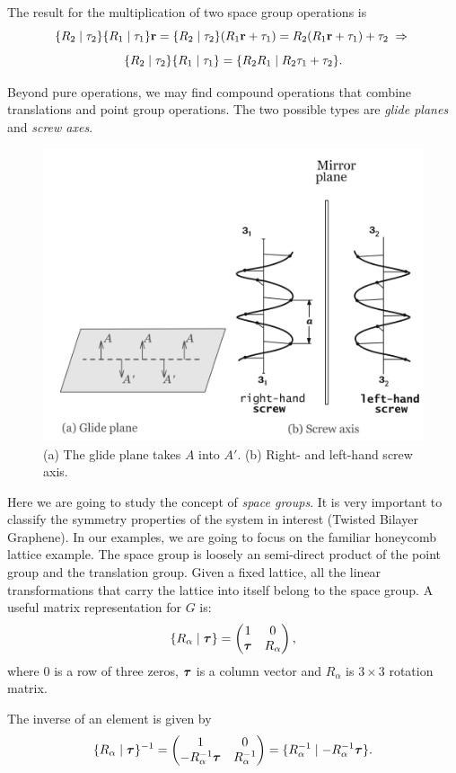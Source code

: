 The result for the multiplication of two space group operations is
$$
\{ R_2 \mid \tau_2 \} \{ R_1 \mid \tau_1 \} {\vb{r}} = \{ R_2 \mid \tau_2 \} (R_1 {\vb{r}} + \tau_1) =
R_2(R_1 {\vb{r}} + \tau_1) + \tau_2 \; \Rightarrow \;
$$
\begin{equation} \label{eq:multiplication_two_space_group_elements}
\{ R_2 \mid \tau_2 \} \{ R_1 \mid \tau_1 \} = \{ R_2 R_1 \mid R_2\tau_1 + \tau_2 \}.
\end{equation}

Beyond pure operations, we may find compound operations that combine translations and point group operations. The two possible types are \textit{glide planes} and \textit{screw axes}.
\begin{figure}[H]
\centering
\includegraphics[width=0.5\linewidth]{fig/glideplane-screwaxis.png}
\caption{(a) The glide plane takes $A$ into $A'$. (b) Right- and left-hand screw axis.}
\label{fig:glideplane-screwaxis}
\end{figure}

Here we are going to study the concept of \textit{space groups}. It is very important to classify the symmetry properties of the system in interest (Twisted Bilayer Graphene). In our examples, we are going to focus on the familiar honeycomb lattice example. The space group is loosely an semi-direct product of the point group and the translation group. Given a fixed lattice, all the linear transformations that carry the lattice into itself belong to the space group. A useful matrix representation for $G$ is:
\begin{equation} \label{eq:spacegroup-rep}
\{ R_\alpha \mid {\bm{\tau}} \} =
\begin{pmatrix}
1 & 0 \\
{\bm{\tau}} & R_\alpha
\end{pmatrix},
\end{equation}
where $0$ is a row of three zeros, ${\bm{\tau}}$ is a column vector and $R_\alpha$ is $3\times 3$ rotation matrix.

The inverse of an element is given by
\begin{equation} \label{eq:inv-spacegroup}
\{ R_\alpha \mid {\bm{\tau}} \}^{-1} =
\begin{pmatrix}
1 & 0 \\
-R_\alpha^{-1}{\bm{\tau}} & R_\alpha^{-1}
\end{pmatrix} =
\{ R_\alpha^{-1} \mid -R_\alpha^{-1}{\bm{\tau}} \}.
\end{equation}

